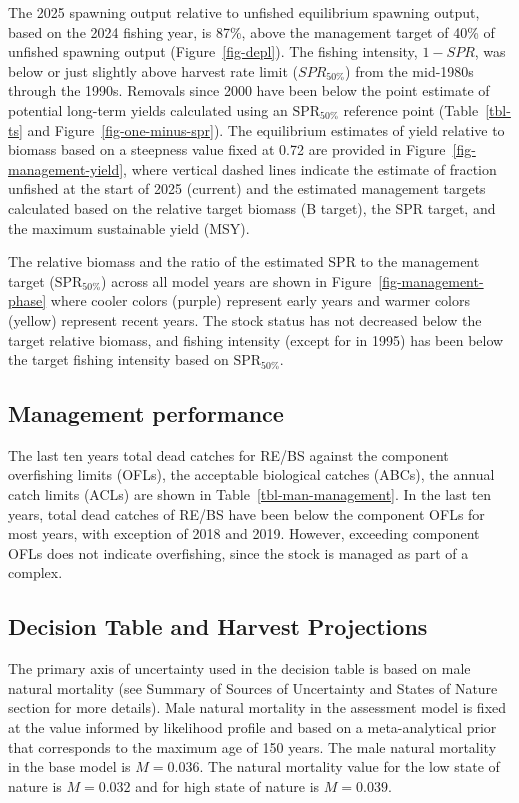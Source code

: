 \documentclass[
]{scrartcl}
\begin{document}
The 2025 spawning output relative to unfished equilibrium spawning
output, based on the 2024 fishing year, is 87\%, above the management
target of 40\% of unfished spawning output (Figure~\ref{fig-depl}). The
fishing intensity, \(1-SPR\), was below or just slightly above harvest
rate limit (\(SPR_{50\%}\)) from the mid-1980s through the 1990s.
Removals since 2000 have been below the point estimate of potential
long-term yields calculated using an \(\text{SPR}_{50\%}\) reference
point (Table~\ref{tbl-ts} and Figure~\ref{fig-one-minus-spr}). The
equilibrium estimates of yield relative to biomass based on a steepness
value fixed at 0.72 are provided in Figure~\ref{fig-management-yield},
where vertical dashed lines indicate the estimate of fraction unfished
at the start of 2025 (current) and the estimated management targets
calculated based on the relative target biomass (B target), the SPR
target, and the maximum sustainable yield (MSY).

The relative biomass and the ratio of the estimated SPR to the
management target (\(\text{SPR}_{50\%}\)) across all model years are
shown in Figure~\ref{fig-management-phase} where cooler colors (purple)
represent early years and warmer colors (yellow) represent recent years.
The stock status has not decreased below the target relative biomass,
and fishing intensity (except for in 1995) has been below the target
fishing intensity based on \(\text{SPR}_{50\%}\).

\subsection{Management performance}\label{management-performance-1}

The last ten years total dead catches for RE/BS against the component
overfishing limits (OFLs), the acceptable biological catches (ABCs), the
annual catch limits (ACLs) are shown in Table~\ref{tbl-man-management}.
In the last ten years, total dead catches of RE/BS have been below the
component OFLs for most years, with exception of 2018 and 2019. However,
exceeding component OFLs does not indicate overfishing, since the stock
is managed as part of a complex.

\subsection{Decision Table and Harvest
Projections}\label{decision-table-and-harvest-projections-1}

The primary axis of uncertainty used in the decision table is based on
male natural mortality (see Summary of Sources of Uncertainty and States
of Nature section for more details). Male natural mortality in the
assessment model is fixed at the value informed by likelihood profile
and based on a meta-analytical prior that corresponds to the maximum age
of 150 years. The male natural mortality in the base model is
\(M = 0.036\). The natural mortality value for the low state of nature
is \(M = 0.032\) and for high state of nature is \(M = 0.039\).
\end{document}
